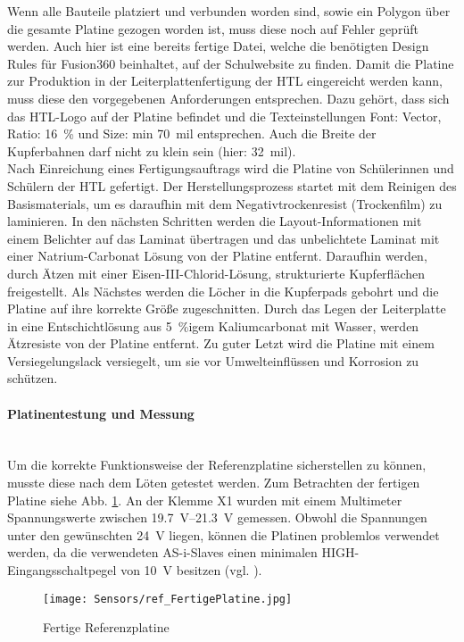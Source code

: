 Wenn alle Bauteile platziert und verbunden worden sind, sowie ein Polygon über die gesamte Platine gezogen worden ist, muss diese noch auf Fehler geprüft werden. Auch hier ist eine bereits fertige Datei, welche die benötigten Design Rules für Fusion360 beinhaltet, auf der Schulwebsite zu finden. Damit die Platine zur Produktion in der Leiterplattenfertigung der HTL eingereicht werden kann, muss diese den vorgegebenen Anforderungen entsprechen. Dazu gehört, dass sich das HTL-Logo auf der Platine befindet und die Texteinstellungen Font: Vector, Ratio: \qty{16}{\percent} und Size: min \qty{70}{mil} entsprechen. Auch die Breite der Kupferbahnen darf nicht zu klein sein (hier: \qty{32}{mil}).\\
Nach Einreichung eines Fertigungsauftrags wird die Platine von Schülerinnen und Schülern der HTL gefertigt. Der Herstellungsprozess startet mit dem Reinigen des Basismaterials, um es daraufhin mit dem Negativtrockenresist (Trockenfilm) zu laminieren. In den nächsten Schritten werden die Layout-Informationen mit einem Belichter auf das Laminat übertragen und das unbelichtete Laminat mit einer Natrium-Carbonat Lösung von der Platine entfernt. Daraufhin werden, durch Ätzen mit einer Eisen-III-Chlorid-Lösung, strukturierte Kupferflächen freigestellt. Als Nächstes werden die Löcher in die Kupferpads gebohrt und die Platine auf ihre korrekte Größe zugeschnitten. Durch das Legen der Leiterplatte in eine Entschichtlösung aus \qty{5}{\percent}{igem} Kaliumcarbonat mit Wasser, werden Ätzresiste von der Platine entfernt. Zu guter Letzt wird die Platine mit einem Versiegelungslack versiegelt, um sie vor Umwelteinflüssen und Korrosion zu schützen.

\paragraph{Platinentestung und Messung} \mbox{}\\
Um die korrekte Funktionsweise der Referenzplatine sicherstellen zu können, musste diese nach dem Löten getestet werden. Zum Betrachten der fertigen Platine siehe Abb. \ref{Ref_fertig}. An der Klemme X1 wurden mit einem Multimeter Spannungswerte zwischen \qtyrange{19.7}{21.3}{\volt} gemessen. Obwohl die Spannungen unter den gewünschten \qty{24}{\volt} liegen, können die Platinen problemlos verwendet werden, da die verwendeten AS-i-Slaves einen minimalen HIGH-Eingangsschaltpegel von \qty{10}{\volt} besitzen (vgl. \cite{AS-i-Slave}).

\begin{figure}[H]
    \centering
    \texttt{[image: Sensors/ref\_FertigePlatine.jpg]}
    \caption{Fertige Referenzplatine}
    \label{Ref_fertig}
\end{figure}

